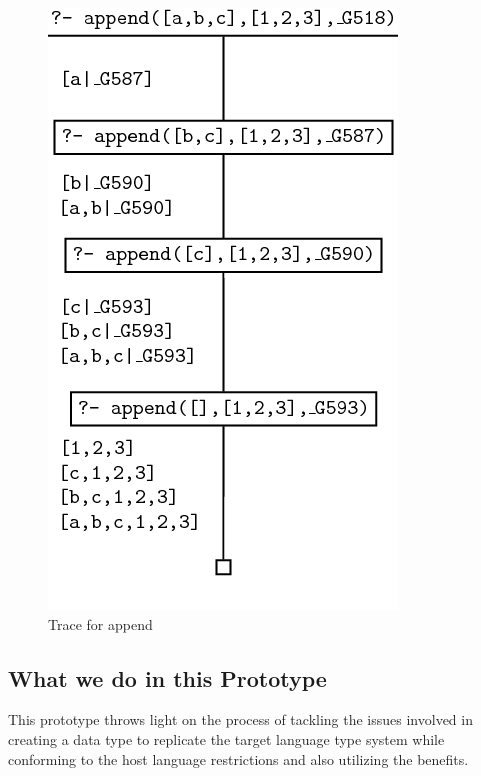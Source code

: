 \documentclass[proposal.tex]{subfiles}
\begin{document}
\begin{figure}[h]
\centering
\includegraphics[scale = 0.5]{PrologAppendWorking.png}
\caption{Trace for append \cite{webiste:learnprolognowappend}}
\label{fig:Trace for append}
\end{figure}  

\subsection{What we do in this Prototype}
This prototype throws light on the process of tackling the issues involved in creating 
a data type to replicate the target language type system while conforming to the host language restrictions and also utilizing the 
benefits. 
\end{document}
